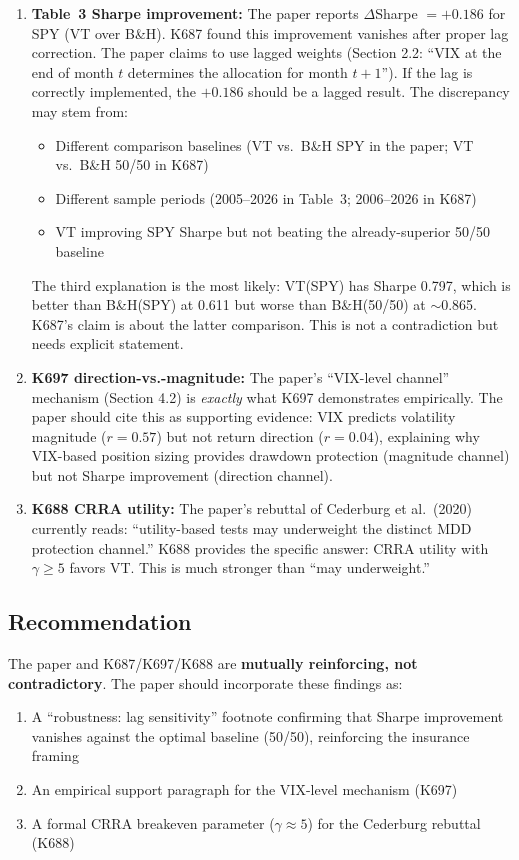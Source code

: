 \documentclass[12pt,a4paper]{article}
\begin{document}
\begin{enumerate}
\item \textbf{Table~3 Sharpe improvement:} The paper reports $\Delta$Sharpe $= +0.186$ for SPY (VT over B\&H). K687 found this improvement vanishes after proper lag correction. The paper claims to use lagged weights (Section 2.2: ``VIX at the end of month $t$ determines the allocation for month $t+1$''). If the lag is correctly implemented, the $+0.186$ should be a lagged result. The discrepancy may stem from:
\begin{itemize}
\item Different comparison baselines (VT vs.\ B\&H SPY in the paper; VT vs.\ B\&H 50/50 in K687)
\item Different sample periods (2005--2026 in Table~3; 2006--2026 in K687)
\item VT improving SPY Sharpe but not beating the already-superior 50/50 baseline
\end{itemize}
The third explanation is the most likely: VT(SPY) has Sharpe 0.797, which is better than B\&H(SPY) at 0.611 but worse than B\&H(50/50) at $\sim$0.865. K687's claim is about the latter comparison. This is not a contradiction but needs explicit statement.

\item \textbf{K697 direction-vs.-magnitude:} The paper's ``VIX-level channel'' mechanism (Section 4.2) is \textit{exactly} what K697 demonstrates empirically. The paper should cite this as supporting evidence: VIX predicts volatility magnitude ($r = 0.57$) but not return direction ($r = 0.04$), explaining why VIX-based position sizing provides drawdown protection (magnitude channel) but not Sharpe improvement (direction channel).

\item \textbf{K688 CRRA utility:} The paper's rebuttal of Cederburg et al.\ (2020) currently reads: ``utility-based tests may underweight the distinct MDD protection channel.'' K688 provides the specific answer: CRRA utility with $\gamma \geq 5$ favors VT. This is much stronger than ``may underweight.''
\end{enumerate}

\subsection{Recommendation}

The paper and K687/K697/K688 are \textbf{mutually reinforcing, not contradictory}. The paper should incorporate these findings as:
\begin{enumerate}
\item A ``robustness: lag sensitivity'' footnote confirming that Sharpe improvement vanishes against the optimal baseline (50/50), reinforcing the insurance framing
\item An empirical support paragraph for the VIX-level mechanism (K697)
\item A formal CRRA breakeven parameter ($\gamma \approx 5$) for the Cederburg rebuttal (K688)
\end{enumerate}
\end{document}
